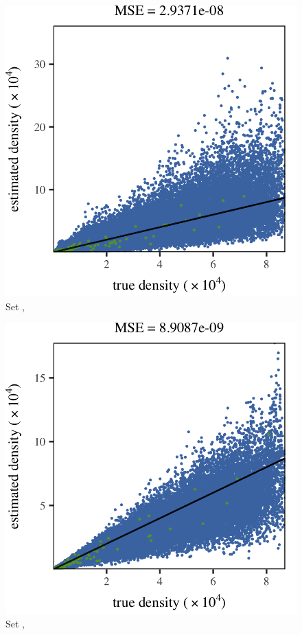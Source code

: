 \begin{subfigure}{0.3\textwidth}
	\centering
	\includegraphics[keepaspectratio=true, width=\textwidth, height=0.23\textheight]{result/img/results_baakman_4_60000_mbe_silverman}
	\caption{Set \baakmanFour, \mbe}
	\label{fig:results:singlesphere:mbe:baakman4}
\end{subfigure}	
\subfigvspace
\begin{subfigure}{0.3\textwidth}
	\centering
	\includegraphics[keepaspectratio=true, width=\textwidth, height=0.23\textheight]{result/img/results_ferdosi_1_60000_sambe_silverman}
	\caption{Set \ferdosiOne, \sambe}
	\label{fig:results:singlesphere:sambe:ferdosi1}
\end{subfigure}
